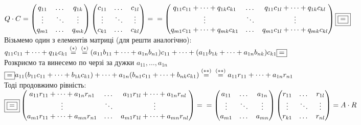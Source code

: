 \documentclass[a4paper, 10pt]{article}
\theoremstyle{theoremdd}
\theoremstyle{theoremdd}
\theoremstyle{theoremdd}
\theoremstyle{theoremdd}
\theoremstyle{theoremdd}
\theoremstyle{theoremdd}
\theoremstyle{theoremdd}
\theoremstyle{theoremdd}
\begin{document}
	$Q \cdot C = \begin{pmatrix}
	q_{11} & \dots & q_{1k} \\
	\vdots & \ddots & \vdots \\
	q_{m1} & \dots & q_{mk}
	\end{pmatrix} \begin{pmatrix}
	c_{11} & \dots & c_{1l} \\
	\vdots & \ddots & \vdots \\
	c_{k1} & \dots & c_{kl}
	\end{pmatrix} = \\ = \begin{pmatrix}
	q_{11}c_{11} + \dots + q_{1k}c_{k1} & \dots & q_{11}c_{1l} + \dots + q_{1k}c_{kl} \\
	\vdots & \ddots & \vdots \\
	q_{m1}c_{11} + \dots + q_{mk}c_{k1} & \dots & q_{m1}c_{1l} + \dots + q_{mk}c_{kl} \\
	\end{pmatrix} \boxed{\boxed{=}}$\\
	Візьмемо один з елементів матриці (для решти аналогічно):\\
	$q_{11}c_{11} + \dots + q_{1k}c_{k1} \overset{(*)}{=} \\ \overset{(*)}{=} (a_{11}b_{11} + \dots + a_{1n}b_{n1})c_{11} + \dots + (a_{11}b_{1k} + \dots + a_{1n}b_{nk})c_{k1} \boxed{=}$\\
	Розкриємо та винесемо по черзі за дужки $a_{11}, \dots, a_{1n}$\\
	$\boxed{=} a_{11}(b_{11}c_{11} + \dots + b_{1k}c_{k1}) + \dots + a_{1n}(b_{n1}c_{11} + \dots + b_{nk}c_{k1}) \overset{(**)}{=} \\ \overset{(**)}{=} a_{11}r_{11} + \dots + a_{1n}r_{n1}$\\
	Тоді продовжимо рівність:\\
	$\boxed{\boxed{=}} \begin{pmatrix}
	a_{11}r_{11} + \dots + a_{1n}r_{n1} & \dots & a_{11}r_{1l} + \dots + a_{1n}r_{nl} \\
	\vdots & \ddots & \vdots \\
	a_{m1}r_{11} + \dots + a_{mn}r_{n1} & \dots & a_{m1}r_{1l} + \dots + a_{mn}r_{nl} \\
	\end{pmatrix} = \\ = 
	\begin{pmatrix}
	a_{11} & \dots & a_{1n} \\
	\vdots & \ddots & \vdots \\
	a_{m1} & \dots & a_{mn} \\
	\end{pmatrix} \begin{pmatrix}
	r_{11} & \dots & r_{1l} \\
	\vdots & \ddots & \vdots \\
	r_{k1} & \dots & r_{nl}
	\end{pmatrix} = A \cdot R$\\
\end{document}
